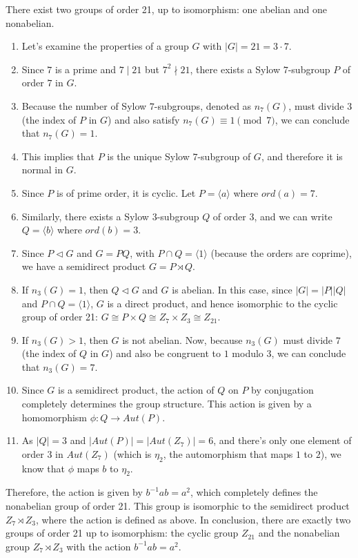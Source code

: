 \newpage

There exist two groups of order 21, up to isomorphism: one abelian and one nonabelian.
\begin{enumerate}[$\bullet$]
    \item 
Let's examine the properties of a group $G$ with $|G| = 21 = 3\cdot7$. \item
Since $7$ is a prime and $7 \mid 21$ but $7^2 \nmid 21$, there exists a Sylow $7$-subgroup $P$ of order $7$ in $G$. \item
Because the number of Sylow $7$-subgroups, denoted as $n_7(G)$, must divide $3$ (the index of $P$ in $G$) and also satisfy $n_7(G) \equiv 1 \pmod{7}$, we can conclude that $n_7(G) = 1$. \item
This implies that $P$ is the unique Sylow $7$-subgroup of $G$, and therefore it is normal in $G$. \item
Since $P$ is of prime order, it is cyclic. Let $P = \langle a \rangle$ where $ord(a) = 7$. \item
Similarly, there exists a Sylow $3$-subgroup $Q$ of order $3$, and we can write $Q = \langle b \rangle$ where $ord(b) = 3$. \item
Since $P \triangleleft G$ and $G = PQ$, with $P\cap Q = \langle 1 \rangle$ (because the orders are coprime), we have a semidirect product $G = P \rtimes Q$. \item
If $n_3(G)=1$, then $Q \triangleleft G$ and $G$ is abelian. In this case, since $|G| = |P||Q|$ and $P\cap Q = \langle 1 \rangle$, $G$ is a direct product, and hence isomorphic to the cyclic group of order 21: $G \cong P \times Q \cong Z_7 \times Z_3 \cong Z_{21}$. \item
If $n_3(G) >1$, then $G$ is not abelian. Now, because $n_3(G)$ must divide $7$ (the index of $Q$ in $G$) and also be congruent to $1$ modulo $3$, we can conclude that $n_3(G) = 7$. \item
Since $G$ is a semidirect product, the action of $Q$ on $P$ by conjugation completely determines the group structure. This action is given by a homomorphism $\phi: Q \rightarrow Aut(P)$. \item
As $|Q|=3$ and $|Aut(P)|=|Aut(Z_7)|=6$, and there's only one element of order 3 in $Aut(Z_7)$ (which is $\eta_2$, the automorphism that maps $1$ to $2$), we know that $\phi$ maps $b$ to $\eta_2$.

\end{enumerate}


Therefore, the action is given by $b^{-1}ab = a^2$, which completely defines the nonabelian group of order 21. This group is isomorphic to the semidirect product $Z_7 \rtimes Z_3$, where the action is defined as above.
In conclusion, there are exactly two groups of order 21 up to isomorphism: the cyclic group $Z_{21}$ and the nonabelian group $Z_7 \rtimes Z_3$ with the action $b^{-1}ab=a^2$.
